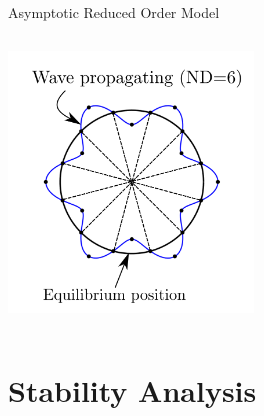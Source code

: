 \documentclass[dvipsnames, aspectratio = 169]{beamer}
\begin{document}
\begin{frame}{Asymptotic Reduced Order Model}
	\begin{columns}
		\begin{column}{0.48\textwidth}
			\includegraphics[width=6.5cm,keepaspectratio]{Mode_shapeND6.png}
		\end{column}
	\end{columns}
\end{frame}


\section{Stability Analysis}
\end{document}
